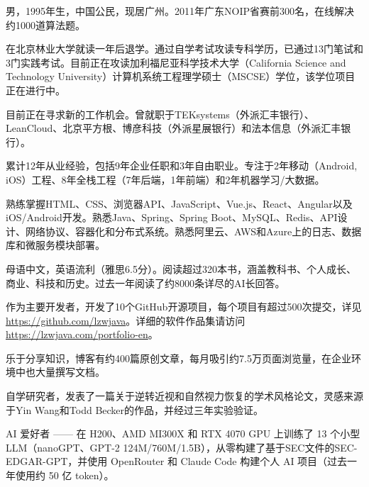 

\begin{cventry}
    {} %
    {} %
    {} %
    {} %
    {
        \begin{cvitems}
            \item {男，1995年生，中国公民，现居广州。2011年广东NOIP省赛前300名，在线解决约1000道算法题。}
            \item {在北京林业大学就读一年后退学。通过自学考试攻读专科学历，已通过13门笔试和3门实践考试。目前正在攻读加利福尼亚科学技术大学（California Science and Technology University）计算机系统工程理学硕士（MSCSE）学位，该学位项目正在进行中。}
            \item {目前正在寻求新的工作机会。曾就职于TEKsystems（外派汇丰银行）、LeanCloud、北京平方根、博彦科技（外派星展银行）和法本信息（外派汇丰银行）。}
            \item {累计12年从业经验，包括9年企业任职和3年自由职业。专注于2年移动（Android, iOS）工程、8年全栈工程（7年后端，1年前端）和2年机器学习/大数据。}
            \item {熟练掌握HTML、CSS、浏览器API、JavaScript、Vue.js、React、Angular以及iOS/Android开发。熟悉Java、Spring、Spring Boot、MySQL、Redis、API设计、网络协议、容器化和分布式系统。熟悉阿里云、AWS和Azure上的日志、数据库和微服务模块部署。}
            \item {母语中文，英语流利（雅思6.5分）。阅读超过320本书，涵盖教科书、个人成长、商业、科技和历史。过去一年阅读了约8000条详尽的AI长回答。}
            \item {作为主要开发者，开发了10个GitHub开源项目，每个项目有超过500次提交，详见\href{https://github.com/lzwjava}{https://github.com/lzwjava}。详细的软件作品集请访问\href{https://lzwjava.com/portfolio-en}{https://lzwjava.com/portfolio-en}。}
            \item {乐于分享知识，博客有约400篇原创文章，每月吸引约7.5万页面浏览量，在企业环境中也大量撰写文档。}
            \item {自学研究者，发表了一篇关于逆转近视和自然视力恢复的学术风格论文，灵感来源于Yin Wang和Todd Becker的作品，并经过三年实验验证。}
            \item {AI 爱好者 —— 在 H200、AMD MI300X 和 RTX 4070 GPU 上训练了 13 个小型 LLM（nanoGPT、GPT-2 124M/760M/1.5B），从零构建了基于SEC文件的SEC-EDGAR-GPT，并使用 OpenRouter 和 Claude Code 构建个人 AI 项目（过去一年使用约 50 亿 token）。}
        \end{cvitems}
    }
\end{cventry}

